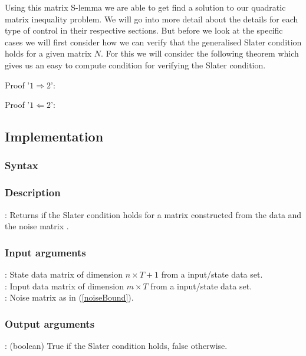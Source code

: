 Using this matrix S-lemma we are able to get find a solution to our quadratic matrix inequality problem. We will go into more detail about the details for each type of control in their respective sections. But before we look at the specific cases we will first consider how we can verify that the generalised Slater condition holds for a given matrix $N$. For this we will consider the following theorem which gives us an easy to compute condition for verifying the Slater condition.


Proof '$1 \Rightarrow 2$': \\

Proof '$1 \Leftarrow 2$': \\


\subsection{Implementation}
\subsubsection*{Syntax}

\subsubsection*{Description}
: Returns if the Slater condition holds for a matrix  constructed from the data  and the noise matrix .

\subsubsection*{Input arguments}
\textbf{}: State data matrix of dimension $n \times T+1$ from a input/state data set.\\
\textbf{}: Input data matrix of dimension $m \times T$ from a input/state data set.\\
\textbf{}: Noise matrix as in (\ref{noiseBound}).

\subsubsection*{Output arguments}
\textbf{}: (boolean) True if the Slater condition holds, false otherwise.













